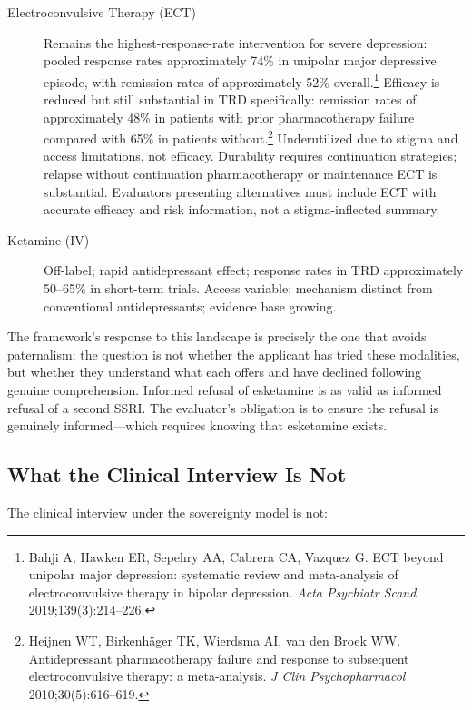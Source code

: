\documentclass[11pt, letterpaper]{article}
\begin{document}
\begin{description}
  \item[Electroconvulsive Therapy (ECT)] Remains the highest-response-rate intervention
    for severe depression: pooled response rates approximately 74\% in unipolar major
    depressive episode, with remission rates of approximately 52\%
    overall.\footnote{%
    Bahji A, Hawken ER, Sepehry AA, Cabrera CA, Vazquez G. ECT beyond unipolar major
    depression: systematic review and meta-analysis of electroconvulsive therapy in
    bipolar depression. \textit{Acta Psychiatr Scand} 2019;139(3):214--226.}
    Efficacy is reduced but still substantial in TRD specifically: remission rates of
    approximately 48\% in patients with prior pharmacotherapy failure compared with
    65\% in patients without.\footnote{%
    Heijnen WT, Birkenh{\"a}ger TK, Wierdsma AI, van den Broek WW. Antidepressant
    pharmacotherapy failure and response to subsequent electroconvulsive therapy:
    a meta-analysis. \textit{J Clin Psychopharmacol} 2010;30(5):616--619.}
    Underutilized due to stigma and access limitations, not efficacy. Durability
    requires continuation strategies; relapse without continuation pharmacotherapy or
    maintenance ECT is substantial. Evaluators presenting alternatives must include
    ECT with accurate efficacy and risk information, not a stigma-inflected summary.

  \item[Ketamine (IV)] Off-label; rapid antidepressant effect; response rates in TRD
    approximately 50--65\% in short-term trials. Access variable; mechanism distinct
    from conventional antidepressants; evidence base growing.
\end{description}

The framework's response to this landscape is precisely the one that avoids paternalism:
the question is not whether the applicant has tried these modalities, but whether they
understand what each offers and have declined following genuine comprehension. Informed
refusal of esketamine is as valid as informed refusal of a second SSRI. The evaluator's
obligation is to ensure the refusal is genuinely informed---which requires knowing that
esketamine exists.

\subsection{What the Clinical Interview Is Not}

The clinical interview under the sovereignty model is not:
\end{document}
